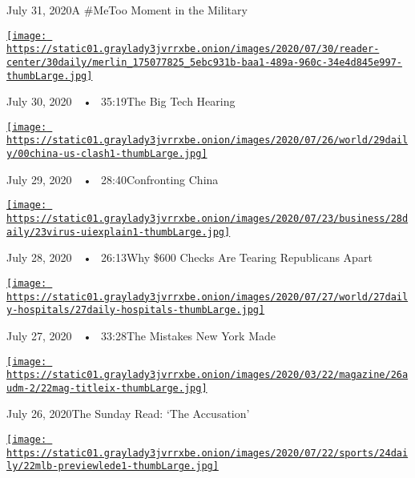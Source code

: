 July 31, 2020A \#MeToo Moment in the Military

\href{https://www.nytimes3xbfgragh.onion/2020/07/30/podcasts/the-daily/congress-facebook-amazon-google-apple.html?action=click\&module=audio-series-bar\&region=header\&pgtype=Article}{\texttt{[image: https://static01.graylady3jvrrxbe.onion/images/2020/07/30/reader-center/30daily/merlin\_175077825\_5ebc931b-baa1-489a-960c-34e4d845e997-thumbLarge.jpg]}}

July 30, 2020~~•~ 35:19The Big Tech Hearing

\href{https://www.nytimes3xbfgragh.onion/2020/07/29/podcasts/the-daily/china-trump-foreign-policy.html?action=click\&module=audio-series-bar\&region=header\&pgtype=Article}{\texttt{[image: https://static01.graylady3jvrrxbe.onion/images/2020/07/26/world/29daily/00china-us-clash1-thumbLarge.jpg]}}

July 29, 2020~~•~ 28:40Confronting China

\href{https://www.nytimes3xbfgragh.onion/2020/07/28/podcasts/the-daily/unemployment-benefits-coronavirus.html?action=click\&module=audio-series-bar\&region=header\&pgtype=Article}{\texttt{[image: https://static01.graylady3jvrrxbe.onion/images/2020/07/23/business/28daily/23virus-uiexplain1-thumbLarge.jpg]}}

July 28, 2020~~•~ 26:13Why \$600 Checks Are Tearing Republicans Apart

\href{https://www.nytimes3xbfgragh.onion/2020/07/27/podcasts/the-daily/new-york-hospitals-covid.html?action=click\&module=audio-series-bar\&region=header\&pgtype=Article}{\texttt{[image: https://static01.graylady3jvrrxbe.onion/images/2020/07/27/world/27daily-hospitals/27daily-hospitals-thumbLarge.jpg]}}

July 27, 2020~~•~ 33:28The Mistakes New York Made

\href{https://www.nytimes3xbfgragh.onion/2020/07/26/podcasts/the-daily/the-accusation-the-sunday-read.html?action=click\&module=audio-series-bar\&region=header\&pgtype=Article}{\texttt{[image: https://static01.graylady3jvrrxbe.onion/images/2020/03/22/magazine/26audm-2/22mag-titleix-thumbLarge.jpg]}}

July 26, 2020The Sunday Read: `The Accusation'

\href{https://www.nytimes3xbfgragh.onion/2020/07/24/podcasts/the-daily/mlb-baseball-season-coronavirus.html?action=click\&module=audio-series-bar\&region=header\&pgtype=Article}{\texttt{[image: https://static01.graylady3jvrrxbe.onion/images/2020/07/22/sports/24daily/22mlb-previewlede1-thumbLarge.jpg]}}

